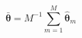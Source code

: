 \begin{equation}
    \bar{\boldsymbol{\theta}}
    =
    M^{-1}
    \sum_{m = 1}^{M}
    \hat{\boldsymbol{\theta}}_{m}
\end{equation}

